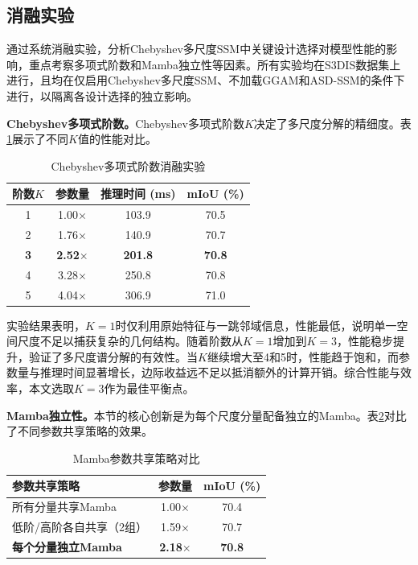 \documentclass[12pt,a4paper,openany,oneside]{ctexbook}
\theoremstyle{definition}
\theoremstyle{remark}
\begin{document}
\subsection{消融实验}

通过系统消融实验，分析Chebyshev多尺度SSM中关键设计选择对模型性能的影响，重点考察多项式阶数和Mamba独立性等因素。所有实验均在S3DIS数据集上进行，且均在仅启用Chebyshev多尺度SSM、不加载GGAM和ASD-SSM的条件下进行，以隔离各设计选择的独立影响。

\textbf{Chebyshev多项式阶数。}Chebyshev多项式阶数$K$决定了多尺度分解的精细度。表\ref{tab:cheb_order}展示了不同$K$值的性能对比。

\begin{table}[htbp!]
\centering
\caption{Chebyshev多项式阶数消融实验}
\label{tab:cheb_order}
\begin{tabular}{@{}cccc@{}}
\toprule
阶数$K$ & 参数量 & 推理时间 (ms) & mIoU (\%) \\
\midrule
1 & 1.00$\times$ & 103.9 & 70.5 \\
2 & 1.76$\times$ & 140.9 & 70.7 \\
\textbf{3} & \textbf{2.52$\times$} & \textbf{201.8} & \textbf{70.8} \\
4 & 3.28$\times$ & 250.8 & 70.8 \\
5 & 4.04$\times$ & 306.9 & 71.0 \\
\bottomrule
\end{tabular}
\end{table}

实验结果表明，$K=1$时仅利用原始特征与一跳邻域信息，性能最低，说明单一空间尺度不足以捕获复杂的几何结构。随着阶数从$K=1$增加到$K=3$，性能稳步提升，验证了多尺度谱分解的有效性。当$K$继续增大至4和5时，性能趋于饱和，而参数量与推理时间显著增长，边际收益远不足以抵消额外的计算开销。综合性能与效率，本文选取$K=3$作为最佳平衡点。

\textbf{Mamba独立性。}本节的核心创新是为每个尺度分量配备独立的Mamba。表\ref{tab:mamba_sharing}对比了不同参数共享策略的效果。

\begin{table}[htbp!]
\centering
\caption{Mamba参数共享策略对比}
\label{tab:mamba_sharing}
\begin{tabular}{@{}lcc@{}}
\toprule
参数共享策略 & 参数量 & mIoU (\%) \\
\midrule
所有分量共享Mamba & 1.00$\times$ & 70.4 \\
低阶/高阶各自共享（2组） & 1.59$\times$ & 70.7 \\
\textbf{每个分量独立Mamba} & \textbf{2.18$\times$} & \textbf{70.8} \\
\bottomrule
\end{tabular}
\end{table}
\end{document}

